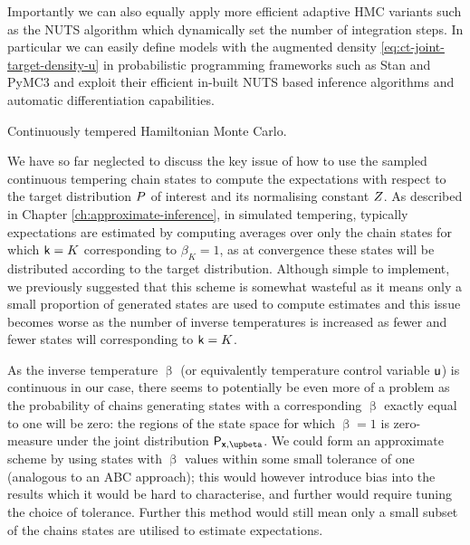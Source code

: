 Importantly we can also equally apply more efficient adaptive \ac{HMC} variants such as the \ac{NUTS} algorithm \citep{hoffman2014no} which dynamically set the number of integration steps. In particular we can easily define models with the augmented density \eqref{eq:ct-joint-target-density-u} in probabilistic programming frameworks such as Stan and PyMC3 and exploit their efficient in-built \ac{NUTS} based inference algorithms and automatic differentiation capabilities.

\begin{algorithm}[t]
\caption[Continuously tempered \acs{HMC}.]{Continuously tempered Hamiltonian Monte Carlo.}
\label{alg:continuously-tempered-hamiltonian-monte-carlo}

\end{algorithm}

We have so far neglected to discuss the key issue of how to use the sampled continuous tempering chain states to compute the expectations with respect to the target distribution $P$ of interest and its normalising constant $Z$. As described in Chapter \ref{ch:approximate-inference}, in simulated tempering, typically expectations are estimated by computing averages over only the chain states for which $\mathsf{k} = K$ corresponding to $\beta_K = 1$, as at convergence these states will be distributed according to the target distribution. Although simple to implement, we previously suggested that this scheme is somewhat wasteful as it means only a small proportion of generated states are used to compute estimates and this issue becomes worse as the number of inverse temperatures is increased as fewer and fewer states will corresponding to $\mathsf{k} = K$.

As the inverse temperature $\upbeta$ (or equivalently temperature control variable $\mathsf{u}$) is continuous in our case, there seems to potentially be even more of a problem as the probability of chains generating states with a corresponding $\upbeta$ exactly equal to one will be zero: the regions of the state space for which $\upbeta=1$ is zero-measure under the joint distribution $\prob{\rvct{x},\upbeta}$. We could form an approximate scheme by using states with $\upbeta$ values within some small tolerance of one (analogous to an \ac{ABC} approach); this would however introduce bias into the results which it would be hard to characterise, and further would require tuning the choice of tolerance. Further this method would still mean only a small subset of the chains states are utilised to estimate expectations.

